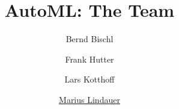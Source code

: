 




\title[AutoML: The Team]{AutoML: The Team}
\author[Marius Lindauer]{Bernd Bischl \and Frank Hutter \and Lars Kotthoff \and \underline{Marius Lindauer}}
\institute{}
\date{}





	
	\maketitle
	

